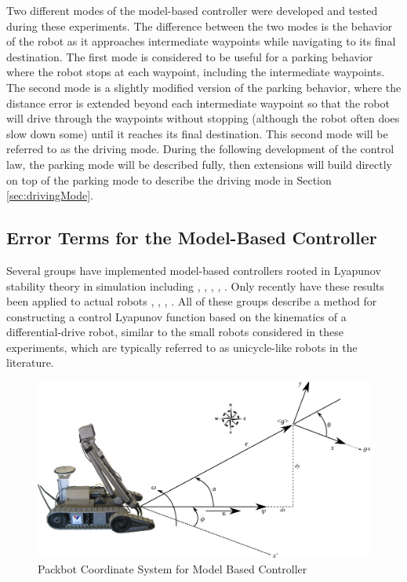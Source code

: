 Two different modes of the model-based controller were developed and tested during these experiments. The difference between the two modes is the behavior of the robot as it approaches intermediate waypoints while navigating to its final destination. The first mode is considered to be useful for a parking behavior where the robot stops at each waypoint, including the intermediate waypoints. The second mode is a slightly modified version of the parking behavior, where the distance error is extended beyond each intermediate waypoint so that the robot will drive through the waypoints without stopping (although the robot often does slow down some) until it reaches its final destination. This second mode will be referred to as the driving mode. During the following development of the control law, the parking mode will be described fully, then extensions will build directly on top of the parking mode to describe the driving mode in Section \ref{sec:drivingMode}.

\subsection{Error Terms for the Model-Based Controller}
\label{sec:errorTermsMBC}
Several groups have implemented model-based controllers rooted in Lyapunov stability theory in simulation including \cite{MicaelliLyapunov93}, \cite{Aicardi94}, \cite{Aicardi_UnicycleLyapunov95}, \cite{Rusu05RobotuxLyapunov}, \cite{Gulati08}. Only recently have these results been applied to actual robots \cite{KimLyapunov05}, \cite{Lapierre06}, \cite{Lapierre07}, \cite{NuchterLyapunov07}. All of these groups describe a method for constructing a control Lyapunov function based on the kinematics of a differential-drive robot, similar to the small robots considered in these experiments, which are typically referred to as unicycle-like robots in the literature.

\begin{figure}[ht!]
	\centering
	\includegraphics[width=.95\textwidth]{images/packbotlyapunov}
	\caption{Packbot Coordinate System for Model Based Controller}
	\label{fig:pblyapunov}
\end{figure}


